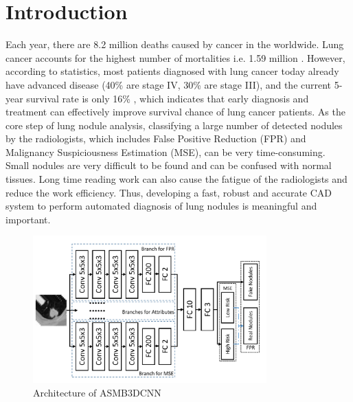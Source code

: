 \documentclass{article}
\begin{document}
\section{Introduction}
\label{sec:intro}
Each year, there are 8.2 million deaths caused by cancer in the worldwide. Lung cancer accounts for the highest number of mortalities i.e. 1.59 million \cite{Wild2014International}. However, according to statistics, most patients diagnosed with lung cancer today already have advanced disease (40\% are stage IV, 30\% are stage III), and the current 5-year survival rate is only 16\% \cite{Bach2012Benefits}, which indicates that early diagnosis and treatment can effectively improve survival chance of lung cancer patients. As the core step of lung nodule analysis, classifying a large number of detected nodules by the radiologists, which includes False Positive Reduction (FPR) and Malignancy Suspiciousness Estimation (MSE), can be very time-consuming. Small nodules are very difficult to be found and can be confused with normal tissues. Long time reading work can also cause the fatigue of the radiologists and reduce the work efficiency. Thus, developing a fast, robust and accurate CAD system to perform automated diagnosis of lung nodules is meaningful and important\cite{Greenspan2016Guest}.
\begin{figure}[*t]
\setlength{\abovecaptionskip}{0.cm}
\setlength{\belowcaptionskip}{-0.cm}
\centerline{\includegraphics[width=90mm]{fig1.pdf}}
\vspace{-0.5cm}
\caption{Architecture of ASMB3DCNN}
\vspace{-0.5cm}
\label{fig1}
\end{figure}
\end{document}
